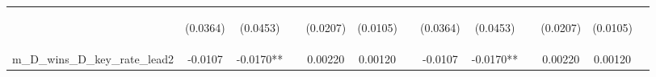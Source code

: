 \documentclass[]{article}
\begin{document}
\begin{center}
\begin{tabular}{lcccccccccccc}
\vspace{4pt} & \begin{footnotesize}(0.0364)\end{footnotesize} & \begin{footnotesize}(0.0453)\end{footnotesize} & \begin{footnotesize}\end{footnotesize} & \begin{footnotesize}(0.0207)\end{footnotesize} & \begin{footnotesize}(0.0105)\end{footnotesize} & \begin{footnotesize}\end{footnotesize} & \begin{footnotesize}(0.0364)\end{footnotesize} & \begin{footnotesize}(0.0453)\end{footnotesize} & \begin{footnotesize}\end{footnotesize} & \begin{footnotesize}(0.0207)\end{footnotesize} & \begin{footnotesize}(0.0105)\end{footnotesize} & \begin{footnotesize}\end{footnotesize} \\
m\_D\_wins\_D\_key\_rate\_lead2 & -0.0107 & -0.0170** &  & 0.00220 & 0.00120 &  & -0.0107 & -0.0170** &  & 0.00220 & 0.00120 &  \\

\end{tabular}
\end{center}
\end{document}
